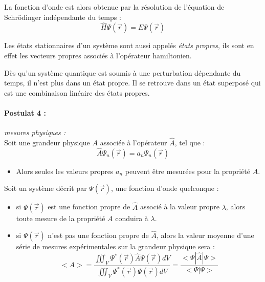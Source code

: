 \documentclass[../main.tex]{subfile}
\begin{document}
   La fonction d'onde est alors obtenue par la résolution de l'équation de Schrödinger indépendante du temps :
   $$\hat{H} \Psi(\vec{r}) = E \Psi(\vec{r})$$

   Les états stationnaires d'un système sont aussi appelés \emph{états propres}, ils sont en effet les vecteurs propres associés à l'opérateur hamiltonien.\\

  \begin{rema} 
   Dès qu'un système quantique est soumis à une perturbation dépendante du temps, il n'est plus dans un état propre. Il se retrouve dans un état superposé qui est une combinaison linéaire des états propres.\\
  \end{rema}

\paragraph{Postulat 4 :} \emph{mesures physiques :}\\

   Soit une grandeur physique $A$ associée à l'opérateur $\hat{A}$, tel que :\\
   $$\hat{A} \Psi_n(\vec{r}) = a_n \Psi_n(\vec{r})$$

  \begin{itemize} 
         \item Alors seules les valeurs propres $a_n$ peuvent être mesurées pour la propriété $A$.\\
  \end{itemize}

   Soit un système décrit par $\Psi(\vec{r})$, une fonction d'onde quelconque :

  \begin{itemize} 
     \item si $\Psi(\vec{r})$ est une fonction propre de $\hat{A}$ associé à la valeur propre $\lambda$, alors toute mesure de la propriété $A$ conduira à $\lambda$.\\

     \item si $\Psi(\vec{r})$ n'est pas une fonction propre de $\hat{A}$, alors la valeur moyenne d'une série de mesures expérimentales sur la grandeur physique sera :
        $$<A> = \frac{\iiint_V \Psi^*(\vec{r}) \hat{A} \Psi(\vec{r}) dV}{\iiint_V \Psi^*(\vec{r})\Psi(\vec{r}) dV} = \frac{<\Psi | \hat{A} | \Psi >}{<\Psi | \Psi >}$$
  \end{itemize}
\end{document}
